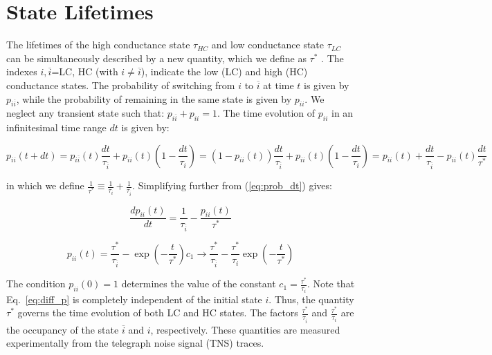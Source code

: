 \documentclass[reprint,amsmath,amssymb,aps,nofootinbib,onecolumn]{revtex4-2}
\begin{document}
\section{State Lifetimes}
The lifetimes of the high conductance state $\tau_{HC}$ and low conductance state $\tau_{LC}$ can be simultaneously described by a new quantity, which we define as $\tau^{*}$ \citep{Khajetoorians2013}. The indexes $i,\overline{i}$=LC, HC (with $i\neq \overline{i}$), indicate the low (LC) and high (HC) conductance states. The probability of switching from $ i$ to $\overline{i} $ at time $t$ is given by $ p_{i \overline{i}} $, while the probability of remaining in the same state is given by $ p_{ii} $. We neglect any transient state such that: $ p_{i\overline{i}} + p_{ii} = 1$. The time evolution of $ p_{ii} $ in an infinitesimal time range $dt$ is given by:

\begin{equation}
p_{ii}(t+dt)=p_{i\overline{i}}(t)\frac{dt}{\tau_{\overline{i}}}+p_{ii}(t)\left( 1-\frac{dt}{\tau_i} \right)=(1-p_{ii}(t))\frac{dt}{\tau_{\overline{i}}}+p_{ii}(t)\left( 1-\frac{dt}{\tau_i} \right)=p_{ii}(t)+\frac{dt}{\tau_{\overline{i}}}-p_{ii}(t)\frac{dt}{\tau^*}
\label{eq:prob_dt}
\end{equation}

in which we define $\frac{1}{\tau^*}\equiv\frac{1}{\tau_i}+\frac{1}{\tau_{\overline{i}}}$. Simplifying further from  (\ref{eq:prob_dt}) gives:

\begin{equation}
\frac{dp_{ii}(t)}{dt}=\frac{1}{\tau_{\overline{i}}}-\frac{p_{ii}(t)}{\tau^*}  
\label{eq:diff_p}
\end{equation}

\begin{equation}
p_{ii}(t)=\frac{\tau^*}{\tau_{\overline{i}}}-\exp(-\frac{t}{\tau^{*}})c_1\rightarrow\frac{\tau^{*}}{\tau_{\overline{i}}}-\frac{\tau^{*}}{\tau_i}\exp(-\frac{t}{\tau^*})
\label{eq:sol_diff}
\end{equation}

The condition $p_{ii}(0)=1$ determines the value of the constant $c_1=\frac{\tau^{*}}{\tau_i}$. Note that Eq.~\ref{eq:diff_p} is completely independent of the initial state $i$. Thus, the quantity $\tau^{*}$ governs the time evolution of both LC and HC states. The factors $\frac{\tau^{*}}{\tau_{\overline{i}}} $ and $ \frac{\tau^{*}}{\tau_{i}} $ are the occupancy of the state $\overline{i}$ and $i$, respectively. These quantities are measured experimentally from the telegraph noise signal (TNS) traces.  
\end{document}
